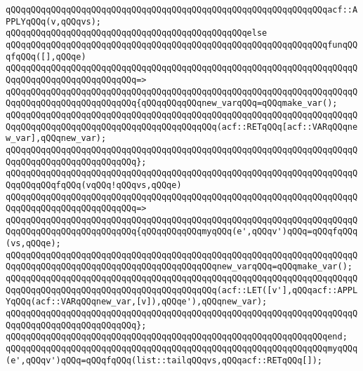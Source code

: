 \verb|qQQqqQQqqQQqqQQqqQQqqQQqqQQqqQQqqQQqqQQqqQQqqQQqqQQqqQQqqQQqqQQqacf::APPLYqQQq(v,qQQqvs);|\newline
\verb|qQQqqQQqqQQqqQQqqQQqqQQqqQQqqQQqqQQqqQQqqQQqqQQqelse|\newline
\verb|qQQqqQQqqQQqqQQqqQQqqQQqqQQqqQQqqQQqqQQqqQQqqQQqqQQqqQQqqQQqqQQqfunqQQqfqQQq([],qQQqe)|\newline
\verb|qQQqqQQqqQQqqQQqqQQqqQQqqQQqqQQqqQQqqQQqqQQqqQQqqQQqqQQqqQQqqQQqqQQqqQQqqQQqqQQqqQQqqQQqqQQqqQQq=>|\newline
\verb|qQQqqQQqqQQqqQQqqQQqqQQqqQQqqQQqqQQqqQQqqQQqqQQqqQQqqQQqqQQqqQQqqQQqqQQqqQQqqQQqqQQqqQQqqQQqqQQq{qQQqqQQqqQQqnew_varqQQq=qQQqmake_var();|\newline
\verb|qQQqqQQqqQQqqQQqqQQqqQQqqQQqqQQqqQQqqQQqqQQqqQQqqQQqqQQqqQQqqQQqqQQqqQQqqQQqqQQqqQQqqQQqqQQqqQQqqQQqqQQqqQQqqQQq(acf::RETqQQq[acf::VARqQQqnew_var],qQQqnew_var);|\newline
\verb|qQQqqQQqqQQqqQQqqQQqqQQqqQQqqQQqqQQqqQQqqQQqqQQqqQQqqQQqqQQqqQQqqQQqqQQqqQQqqQQqqQQqqQQqqQQqqQQq};|\newline
\newline
\verb|qQQqqQQqqQQqqQQqqQQqqQQqqQQqqQQqqQQqqQQqqQQqqQQqqQQqqQQqqQQqqQQqqQQqqQQqqQQqqQQqfqQQq(vqQQq!qQQqvs,qQQqe)|\newline
\verb|qQQqqQQqqQQqqQQqqQQqqQQqqQQqqQQqqQQqqQQqqQQqqQQqqQQqqQQqqQQqqQQqqQQqqQQqqQQqqQQqqQQqqQQqqQQqqQQq=>|\newline
\verb|qQQqqQQqqQQqqQQqqQQqqQQqqQQqqQQqqQQqqQQqqQQqqQQqqQQqqQQqqQQqqQQqqQQqqQQqqQQqqQQqqQQqqQQqqQQqqQQq{qQQqqQQqqQQqmyqQQq(e',qQQqv')qQQq=qQQqfqQQq(vs,qQQqe);|\newline
\verb|qQQqqQQqqQQqqQQqqQQqqQQqqQQqqQQqqQQqqQQqqQQqqQQqqQQqqQQqqQQqqQQqqQQqqQQqqQQqqQQqqQQqqQQqqQQqqQQqqQQqqQQqqQQqqQQqnew_varqQQq=qQQqmake_var();|\newline
\verb|qQQqqQQqqQQqqQQqqQQqqQQqqQQqqQQqqQQqqQQqqQQqqQQqqQQqqQQqqQQqqQQqqQQqqQQqqQQqqQQqqQQqqQQqqQQqqQQqqQQqqQQqqQQqqQQq(acf::LET([v'],qQQqacf::APPLYqQQq(acf::VARqQQqnew_var,[v]),qQQqe'),qQQqnew_var);|\newline
\verb|qQQqqQQqqQQqqQQqqQQqqQQqqQQqqQQqqQQqqQQqqQQqqQQqqQQqqQQqqQQqqQQqqQQqqQQqqQQqqQQqqQQqqQQqqQQqqQQq};|\newline
\verb|qQQqqQQqqQQqqQQqqQQqqQQqqQQqqQQqqQQqqQQqqQQqqQQqqQQqqQQqqQQqqQQqend;|\newline
\newline
\verb|qQQqqQQqqQQqqQQqqQQqqQQqqQQqqQQqqQQqqQQqqQQqqQQqqQQqqQQqqQQqqQQqmyqQQq(e',qQQqv')qQQq=qQQqfqQQq(list::tailqQQqvs,qQQqacf::RETqQQq[]);|\newline
